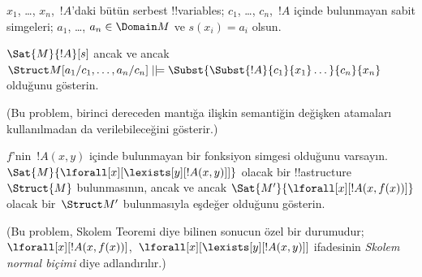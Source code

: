 \begin{prob}
\begin{enumerate}

\end{enumerate}
$x_1$, \dots, $x_n$,~$!A$'daki bütün serbest !!{variable}s;
$c_1$, \dots, $c_n$,~$!A$ içinde bulunmayan sabit simgeleri;
$a_1$, \dots, $a_n \in \Domain M$ ve $s(x_i) = a_i$ olsun.

$\Sat{M}{!A}[s]$ ancak ve ancak
$\Struct M[a_1/c_1,\dots,a_n/c_n]
\VDash \Subst{\Subst{!A}{c_1}{x_1}\dots}{c_n}{x_n}$ olduğunu gösterin.

(Bu problem, birinci dereceden mantığa ilişkin semantiğin değişken
atamaları kullanılmadan da verilebileceğini gösterir.)
\end{prob}

\begin{prob}
$f$'nin~$!A(x,y)$ içinde bulunmayan bir fonksiyon simgesi olduğunu
varsayın. $\Sat{M}{\lforall[x][\lexists[y][!A(x,y)]]}$ olacak bir
!!a{structure}~$\Struct{M}$ bulunmasının, ancak ve ancak
$\Sat{M'}{\lforall[x][!A(x,f(x))]}$ olacak bir~$\Struct M'$ bulunmasıyla
eşdeğer olduğunu gösterin.

(Bu problem, Skolem Teoremi diye bilinen sonucun özel bir durumudur;
$\lforall[x][!A(x,f(x))]$,~$\lforall[x][\lexists[y][!A(x,y)]]$ ifadesinin
\emph{Skolem normal biçimi} diye adlandırılır.)
\end{prob}

